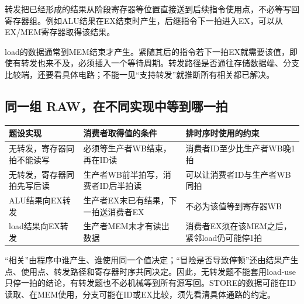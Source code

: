 转发把已经形成的结果从阶段寄存器等位置直接送到后续指令使用点，不必等写回寄存器组。例如ALU结果在EX结束时产生，后继指令下一拍进入EX，可以从EX/MEM寄存器取得该结果。

load的数据通常到MEM结束才产生。紧随其后的指令若下一拍EX就需要该值，即使有转发也来不及，必须插入一个等待周期。转发路径是否通往存储数据端、分支比较端，还要看具体电路；不能一见``支持转发''就推断所有相关都已解决。

\subsection{同一组 RAW，在不同实现中等到哪一拍}\label{ux540cux4e00ux7ec4-rawux5728ux4e0dux540cux5b9eux73b0ux4e2dux7b49ux5230ux54eaux4e00ux62cd}

\par\medskip\noindent\begin{minipage}{\linewidth}\fontsize{9.3}{12}\selectfont\begin{tabularx}{\linewidth}{@{}YYY@{}}
\toprule\noalign{}
\begin{minipage}[b]{\linewidth}\raggedright
题设实现
\end{minipage} & \begin{minipage}[b]{\linewidth}\raggedright
消费者取得值的条件
\end{minipage} & \begin{minipage}[b]{\linewidth}\raggedright
排时序时使用的约束
\end{minipage} \\
\midrule\noalign{}


无转发，寄存器同拍不能读写 & 必须等生产者WB结束，再在ID读 & 消费者ID至少比生产者WB晚1拍 \\
无转发，寄存器同拍先写后读 & 生产者WB前半拍写，消费者ID后半拍读 & 可以让消费者ID与生产者WB同拍 \\
ALU结果向EX转发 & 生产者EX末已有结果，下一拍送消费者EX & 不必为该值等到寄存器WB \\
load结果向EX转发 & 生产者MEM末才有读出数据 & 消费者EX须在该MEM之后，紧邻load仍可能停1拍 \\
\bottomrule\end{tabularx}
\end{minipage}\par\medskip

``相关''由程序中谁产生、谁使用同一个值决定；``冒险是否导致停顿''还由结果产生点、使用点、转发路径和寄存器时序共同决定。因此，无转发题不能套用load-use只停一拍的结论，有转发题也不必机械等到所有源写回。STORE的数据可能在ID读取、在MEM使用，分支可能在ID或EX比较，须先看清具体通路的约定。

